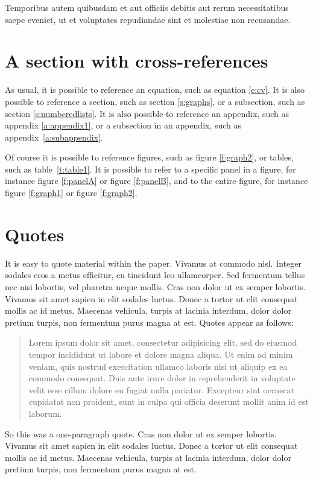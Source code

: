 \documentclass[letterpaper,11pt,leqno]{article}
\begin{document}
Temporibus autem quibusdam et aut officiis debitis aut rerum necessitatibus saepe eveniet, ut et voluptates repudiandae sint et molestiae non recusandae.

\section{A section with cross-references}

As usual, it is possible to reference an equation, such as equation \eqref{e:cv}. It is also possible to reference a section, such as section \ref{s:graphs}, or a subsection, such as section \ref{s:numberedlists}. It is also possible to reference an appendix, such as appendix \ref{a:appendix1}, or a subsection in an appendix, such as appendix~\ref{a:subappendix}. 

Of course it is possible to reference figures, such as figure \ref{f:graph2}, or tables, such as table~\ref{t:table1}. It is possible to refer to a specific panel in a figure, for instance figure \ref{f:panelA} or figure \ref{f:panelB}, and to the entire figure, for instance figure \ref{f:graph1} or figure \ref{f:graph2}.

\section{Quotes}

It is easy to quote material within the paper. Vivamus at commodo nisl. Integer sodales eros a metus efficitur, eu tincidunt leo ullamcorper. Sed fermentum tellus nec nisi lobortis, vel pharetra neque mollis. Cras non dolor ut ex semper lobortis. Vivamus sit amet sapien in elit sodales luctus. Donec a tortor ut elit consequat mollis ac id metus. Maecenas vehicula, turpis at lacinia interdum, dolor dolor pretium turpis, non fermentum purus magna at est. Quotes appear as follows:

\begin{quote}
Lorem ipsum dolor sit amet, consectetur adipisicing elit, sed do eiusmod
tempor incididunt ut labore et dolore magna aliqua. Ut enim ad minim veniam,
quis nostrud exercitation ullamco laboris nisi ut aliquip ex ea commodo
consequat. Duis aute irure dolor in reprehenderit in voluptate velit esse
cillum dolore eu fugiat nulla pariatur. Excepteur sint occaecat cupidatat non
proident, sunt in culpa qui officia deserunt mollit anim id est laborum.
\end{quote}

So this was a one-paragraph quote. Cras non dolor ut ex semper lobortis. Vivamus sit amet sapien in elit sodales luctus. Donec a tortor ut elit consequat mollis ac id metus. Maecenas vehicula, turpis at lacinia interdum, dolor dolor pretium turpis, non fermentum purus magna at est. 
\end{document}

